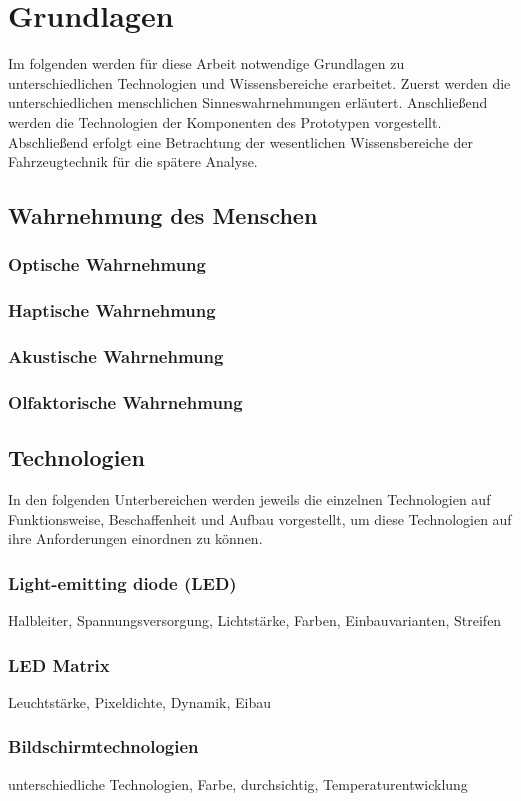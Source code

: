 \chapter{Grundlagen}
\label{cha:Grundlagen}
Im folgenden werden für diese Arbeit notwendige Grundlagen zu unterschiedlichen Technologien und Wissensbereiche erarbeitet. Zuerst werden die unterschiedlichen menschlichen Sinneswahrnehmungen erläutert. Anschließend werden die Technologien der Komponenten des Prototypen vorgestellt. Abschließend erfolgt eine Betrachtung der wesentlichen Wissensbereiche der Fahrzeugtechnik für die spätere Analyse.
\section{Wahrnehmung des Menschen}

\subsection{Optische Wahrnehmung}
\subsection{Haptische Wahrnehmung}
\subsection{Akustische Wahrnehmung}
\subsection{Olfaktorische Wahrnehmung}

\section{Technologien}
In den folgenden Unterbereichen werden jeweils die einzelnen Technologien auf Funktionsweise, Beschaffenheit und Aufbau vorgestellt, um diese Technologien auf ihre Anforderungen einordnen zu können.
\subsection{Light-emitting diode (LED)}
Halbleiter, Spannungsversorgung, Lichtstärke, Farben, Einbauvarianten, Streifen
\subsection{LED Matrix}
Leuchtstärke, Pixeldichte, Dynamik, Eibau
\subsection{Bildschirmtechnologien}
unterschiedliche Technologien, Farbe, durchsichtig, Temperaturentwicklung
